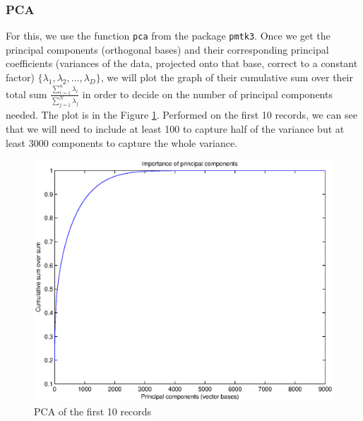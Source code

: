 \subsubsection{PCA}
	For this, we use the function \verb!pca! from the package \verb!pmtk3!. Once we get the principal components (orthogonal bases) and their corresponding principal coefficients (variances of the data, projected onto that base, correct to a constant factor) $\{\lambda_1, \lambda_2, \dotsc, \lambda_D\}$, we will plot the graph of their cumulative sum over their total sum $\frac{\sum_{i = 1}^n \lambda_i}{\sum_{j = 1}^N \lambda_j}$ in order to decide on the number of principal components needed. The plot is in the Figure \ref{fig:visualisePca}. Performed on the first 10 records, we can see that we will need to include at least 100 to capture half of the variance but at least 3000 components to capture the whole variance.

	\begin{figure}[ht!]
		\centering
			\includegraphics[width=.5\textwidth]{drawings/visualisePca.eps}
		\caption{PCA of the first 10 records}
		\label{fig:visualisePca}
	\end{figure}